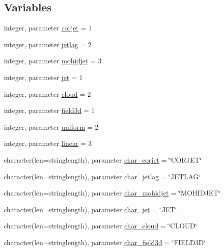 \subsection*{Variables}
\begin{DoxyCompactItemize}
\item 
integer, parameter \mbox{\hyperlink{namespacemodulejet_a47f0eeeb3926639ae9bc14b922a7f57c}{corjet}} = 1
\item 
integer, parameter \mbox{\hyperlink{namespacemodulejet_a0eac969bec0ab0471a9981f588069599}{jetlag}} = 2
\item 
integer, parameter \mbox{\hyperlink{namespacemodulejet_a66d6965728ead70e0e7ec473e5f3892a}{mohidjet}} = 3
\item 
integer, parameter \mbox{\hyperlink{namespacemodulejet_a40df7356ca4c8528a71bb58c601ebd49}{jet}} = 1
\item 
integer, parameter \mbox{\hyperlink{namespacemodulejet_a9e881f4c022dfb8c88bf0a80253f418d}{cloud}} = 2
\item 
integer, parameter \mbox{\hyperlink{namespacemodulejet_afc8a4f2043befe1347d4c124fa51f8fe}{field3d}} = 1
\item 
integer, parameter \mbox{\hyperlink{namespacemodulejet_aded2b1f058efa2a87b81b1014237d1dd}{uniform}} = 2
\item 
integer, parameter \mbox{\hyperlink{namespacemodulejet_a348a978ca201c1b1d5cce70caf9ffbca}{linear}} = 3
\item 
character(len=stringlength), parameter \mbox{\hyperlink{namespacemodulejet_aaf2968de3c9e21de5bf36921280173ea}{char\+\_\+corjet}} = \char`\"{}C\+O\+R\+J\+ET\char`\"{}
\item 
character(len=stringlength), parameter \mbox{\hyperlink{namespacemodulejet_a095e7e5dbe90a0743f6b20da582f4b36}{char\+\_\+jetlag}} = \char`\"{}J\+E\+T\+L\+AG\char`\"{}
\item 
character(len=stringlength), parameter \mbox{\hyperlink{namespacemodulejet_a5d2a3c56461cb3ab743e4cf3e43ef5c4}{char\+\_\+mohidjet}} = \char`\"{}M\+O\+H\+I\+D\+J\+ET\char`\"{}
\item 
character(len=stringlength), parameter \mbox{\hyperlink{namespacemodulejet_aefbc78bb0522ce92db2a8c9ebb93b89d}{char\+\_\+jet}} = \char`\"{}J\+ET\char`\"{}
\item 
character(len=stringlength), parameter \mbox{\hyperlink{namespacemodulejet_ada08e627a6d079948c1b003fbb4123d3}{char\+\_\+cloud}} = \char`\"{}C\+L\+O\+UD\char`\"{}
\item 
character(len=stringlength), parameter \mbox{\hyperlink{namespacemodulejet_ab29798d11a7038ce6bed995f6906602b}{char\+\_\+field3d}} = \char`\"{}F\+I\+E\+L\+D3D\char`\"{}

\end{DoxyCompactItemize}
